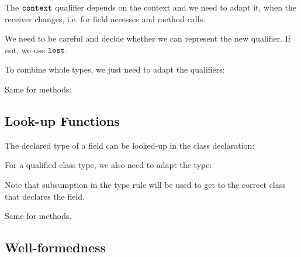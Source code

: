 The $ \texttt{\upshape{context}\,\!} $ qualifier depends on the context and we need to
adapt it, when the receiver changes, i.e. for field accesses and
method calls.

We need to be careful and decide whether we can represent the new
qualifier. If not, we use $ \texttt{\upshape{lost}\,\!} $.

\vspace{0.5ex}
\ottdefnqcombqrules{}
\vspace{2.0ex}


To combine whole types, we just need to adapt the qualifiers:

\vspace{0.5ex}
\ottdefnqcombtrules{}
\vspace{2.0ex}


Same for methods:

\vspace{0.5ex}
\ottdefnqcombmsrules{}
\vspace{2.0ex}



\subsection{Look-up Functions}

The declared type of a field can be looked-up in the class
declaration:

\vspace{0.5ex}
\ottdefnsftypec{}
\vspace{2.0ex}


For a qualified class type, we also need to adapt the type:

\vspace{0.5ex}
\ottdefnsftypet{}
\vspace{2.0ex}


Note that subsumption in the type rule will be used to get to the
correct class that declares the field.

Same for methods.

\vspace{0.5ex}
\ottdefnsmsigc{}
\vspace{2.0ex}


\vspace{0.5ex}
\ottdefnsmsigt{}
\vspace{2.0ex}


\subsection{Well-formedness}

